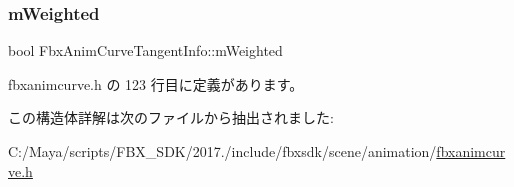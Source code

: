 \subsubsection{\texorpdfstring{m\+Weighted}{mWeighted}}
{\footnotesize\ttfamily bool Fbx\+Anim\+Curve\+Tangent\+Info\+::m\+Weighted}



 fbxanimcurve.\+h の 123 行目に定義があります。



この構造体詳解は次のファイルから抽出されました\+:\begin{DoxyCompactItemize}
\item 
C\+:/\+Maya/scripts/\+F\+B\+X\+\_\+\+S\+D\+K/2017./include/fbxsdk/scene/animation/\hyperlink{fbxanimcurve_8h}{fbxanimcurve.\+h}\end{DoxyCompactItemize}
